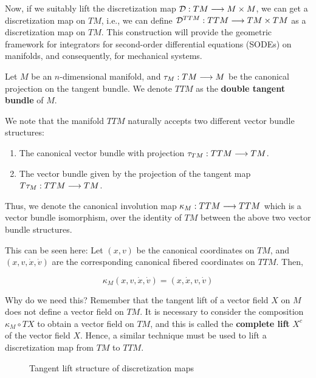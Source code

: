 Now, if we suitably lift the discretization map $\mathcal{D} : TM \longrightarrow M \times M$, we can get a discretization map on $TM$, i.e., we can define $\mathcal{D}^{TTM} : TTM \longrightarrow TM \times TM$ as a discretization map on $TM$. This construction will provide the geometric framework for integrators for second-order differential equations (SODEs) on manifolds, and consequently, for mechanical systems.

Let $M$ be an $n$-dimensional manifold, and $\tau_M : TM \longrightarrow M$ be the canonical projection on the tangent bundle. We denote $TTM$ as the \textbf{double tangent bundle} of $M$.

We note that the manifold $TTM$ naturally accepts two different vector bundle structures:

\begin{enumerate}
  \item The canonical vector bundle with projection $\tau_{TM} : TTM \longrightarrow TM$.
  \item The vector bundle given by the projection of the tangent map $T \tau_M : TTM \longrightarrow TM$. 
\end{enumerate}

Thus, we denote the canonical involution map $\kappa_M : TTM \longrightarrow TTM$ which is a vector bundle isomorphism, over the identity of $TM$ between the above two vector bundle structures.

This can be seen here: Let $(x,v)$ be the canonical coordinates on $TM$, and $(x, v, \dot{x}, \dot{v})$ are the corresponding canonical fibered coordinates on $TTM$. Then,

\[
 \kappa_M (x, v, \dot{x}, \dot{v}) = (x,\dot{x}, v, \dot{v})
\]

\begin{rmk}{Why do we need this?}
  Remember that the tangent lift of a vector field $X$ on $M$ does not define a vector field on $TM$. It is necessary to consider the composition $\kappa_M \circ TX$ to obtain a vector field on $TM$, and this is called the \textbf{complete lift} $X^c$ of the vector field $X$. 
  Hence, a similar technique must be used to lift a discretization map from $TM$ to $TTM$.
\end{rmk}

\begin{figure}[h]
  \centering
  \caption{Tangent lift structure of discretization maps}
  \label{fig:tangent-lift}
\end{figure}

